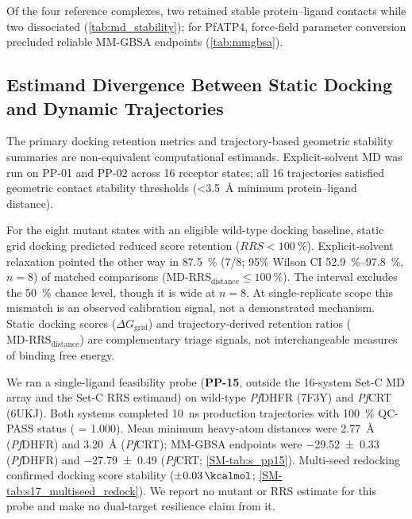 \documentclass[journal=jcisd8,manuscript=article,layout=traditional]{achemso}
\begin{document}
Of the four reference complexes, two retained stable protein--ligand contacts while two dissociated (\cref{tab:md_stability}); for PfATP4, force-field parameter conversion precluded reliable MM-GBSA endpoints (\cref{tab:mmgbsa}).



\subsection{Estimand Divergence Between Static Docking and Dynamic Trajectories}

The primary docking retention metrics and trajectory-based geometric stability summaries are non-equivalent computational estimands. Explicit-solvent MD was run on PP-01 and PP-02 across 16 receptor states; all 16 trajectories satisfied geometric contact stability thresholds (\qty{<3.5}{\angstrom} minimum protein--ligand distance).

For the eight mutant states with an eligible wild-type docking baseline, static grid docking predicted reduced score retention ($RRS < \qty{100}{\percent}$). Explicit-solvent relaxation pointed the other way in \qty{87.5}{\percent} (7/8; 95\% Wilson CI \qtyrange{52.9}{97.8}{\percent}, $n=\num{8}$) of matched comparisons ($\mathrm{MD\text{-}RRS}_{\mathrm{distance}} \le \qty{100}{\percent}$). The interval excludes the \qty{50}{\percent} chance level, though it is wide at $n=\num{8}$. At single-replicate scope this mismatch is an observed calibration signal, not a demonstrated mechanism. Static docking scores ($\Delta G_{\mathrm{grid}}$) and trajectory-derived retention ratios ($\mathrm{MD\text{-}RRS}_{\mathrm{distance}}$) are complementary triage signals, not interchangeable measures of binding free energy.

We ran a single-ligand feasibility probe (\textbf{PP-15}, outside the 16-system Set-C MD array and the Set-C RRS estimand) on wild-type \textit{Pf}DHFR (7F3Y) and \textit{Pf}CRT (6UKJ). Both systems completed \qty{10}{\ns} production trajectories with \qty{100}{\percent} QC-PASS status ( = \num{1.000}). Mean minimum heavy-atom distances were \qty{2.77}{\angstrom} (\textit{Pf}DHFR) and \qty{3.20}{\angstrom} (\textit{Pf}CRT); MM-GBSA endpoints were \qty{-29.52 \pm 0.33}{\kcalmol} (\textit{Pf}DHFR) and \qty{-27.79 \pm 0.49}{\kcalmol} (\textit{Pf}CRT; \cref{SM-tab:s_pp15}). Multi-seed redocking confirmed docking score stability ($\pm\qty{0.03}{\kcalmol}$; \cref{SM-tab:s17_multiseed_redock}). We report no mutant or RRS estimate for this probe and make no dual-target resilience claim from it.
\end{document}
